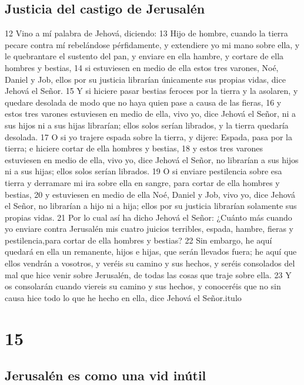 \section*{Justicia del castigo de Jerusalén}

12 Vino a mí palabra de Jehová, diciendo:
13 Hijo de hombre, cuando la tierra pecare contra mí rebelándose pérfidamente, y extendiere yo mi mano sobre ella, y le quebrantare el sustento del pan, y enviare en ella hambre, y cortare de ella hombres y bestias,
14 si estuviesen en medio de ella estos tres varones, Noé, Daniel y Job, ellos por su justicia librarían únicamente sus propias vidas, dice Jehová el Señor.
15 Y si hiciere pasar bestias feroces por la tierra y la asolaren, y quedare desolada de modo que no haya quien pase a causa de las fieras,
16 y estos tres varones estuviesen en medio de ella, vivo yo, dice Jehová el Señor, ni a sus hijos ni a sus hijas librarían; ellos solos serían librados, y la tierra quedaría desolada.
17 O si yo trajere espada sobre la tierra, y dijere: Espada, pasa por la tierra; e hiciere cortar de ella hombres y bestias, 
18 y estos tres varones estuviesen en medio de ella, vivo yo, dice Jehová el Señor, no librarían a sus hijos ni a sus hijas; ellos solos serían librados.
19 O si enviare pestilencia sobre esa tierra y derramare mi ira sobre ella en sangre, para cortar de ella hombres y bestias,
20 y estuviesen en medio de ella Noé, Daniel y Job, vivo yo, dice Jehová el Señor, no librarían a hijo ni a hija; ellos por su justicia librarían solamente sus propias vidas.
21 Por lo cual así ha dicho Jehová el Señor: ¿Cuánto más cuando yo enviare contra Jerusalén mis cuatro juicios terribles, espada, hambre, fieras y pestilencia,para cortar de ella hombres y bestias?
22 Sin embargo, he aquí quedará en ella un remanente, hijos e hijas, que serán llevados fuera; he aquí que ellos vendrán a vosotros, y veréis su camino y sus hechos, y seréis consolados del mal que hice venir sobre Jerusalén, de todas las cosas que traje sobre ella.
23 Y os consolarán cuando viereis su camino y sus hechos, y conoceréis que no sin causa hice todo lo que he hecho en ella, dice Jehová el Señor.itulo

\chapter{15}

\section*{Jerusalén es como una vid inútil}

